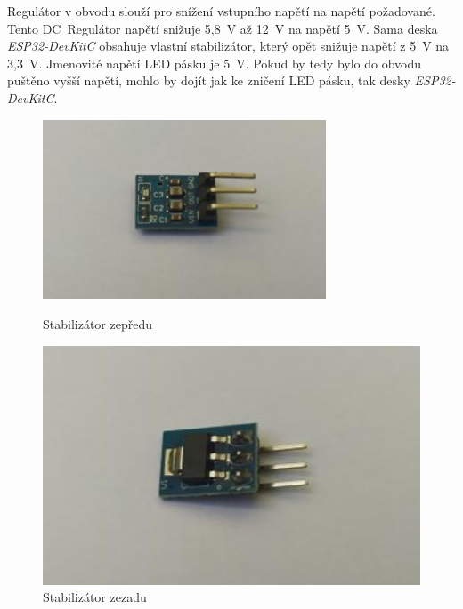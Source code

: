 Regulátor v obvodu slouží pro snížení vstupního napětí na napětí požadované. Tento DC~Regulátor napětí \cite{DollaTek} snižuje 5,8~V až 12~V na napětí 5~V. Sama deska \textit{ESP32-DevKitC} obsahuje vlastní stabilizátor, který opět snižuje napětí z 5~V na 3,3~V. Jmenovité napětí LED pásku je 5~V. Pokud by tedy bylo do obvodu puštěno vyšší napětí, mohlo by dojít jak ke zničení LED pásku, tak desky \textit{ESP32-DevKitC}.



    \begin{figure}[htbp]
	\centering
	\begin{minipage}[b]{0.5\textwidth}
		\centering
		\includegraphics[width=0.75\textwidth]{img/02ele/Stepdownfront.jpg}
		\caption{Stabilizátor zepředu}
	\end{minipage}
	\hfill
	\begin{minipage}[b]{0.4\textwidth}
		\centering
		\includegraphics[width=1\textwidth]{img/02ele/Stepdownback.jpg}
		\caption{Stabilizátor zezadu}
	\end{minipage}
\end{figure}



